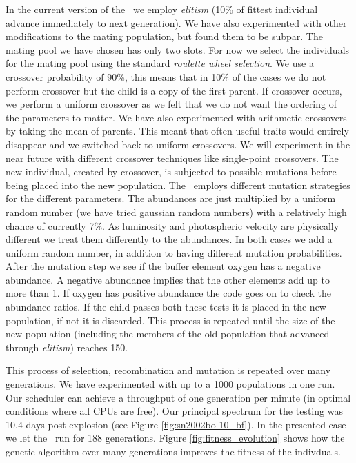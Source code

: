 In the current version of the \dalek\ we employ \textit{elitism} (10\% of fittest individual advance immediately to next generation). We have also experimented with other modifications to the mating population, but found them to be subpar. The mating pool we have chosen has only two slots. For now we select the individuals for the mating pool using the standard \textit{roulette wheel selection}. We use a crossover probability of 90\%, this means that in 10\% of the cases we do not perform crossover but the child is a copy of the first parent. If crossover occurs, we perform a uniform crossover as we felt that we do not want the ordering of the parameters to matter. We have also experimented with arithmetic crossovers by taking the mean of parents. This meant that often useful traits would entirely disappear and we switched back to uniform crossovers. We will experiment in the near future with different crossover techniques like single-point crossovers. The new individual, created by crossover, is subjected to possible mutations before being placed into the new population. The \dalek\ employs different mutation strategies for the different parameters. The abundances are just multiplied by a uniform random number (we have tried gaussian random numbers) with a relatively high chance of currently 7\%. As luminosity and photospheric velocity are physically different we treat them differently to the abundances. In both cases we add a uniform random number, in addition to having different mutation probabilities. After the mutation step we see if the buffer element oxygen has a negative abundance. A negative abundance implies that the other elements add up to more than 1. If oxygen has positive abundance the code goes on to check the abundance ratios. If the child passes both these tests it is placed in the new population, if not it is discarded. This process is repeated until the size of the new population (including the members of the old population that advanced through \textit{elitism}) reaches 150.

This process of selection, recombination and mutation is repeated over many generations. We have experimented with up to a 1000 populations in one run. Our scheduler can achieve a throughput of one generation per minute (in optimal conditions where all CPUs are free). 
Our principal spectrum for the testing was  10.4 days post explosion (see Figure \ref{fig:sn2002bo-10_bf}). 
In the presented case we let the \ga\ run for 188 generations. Figure \ref{fig:fitness_evolution} shows how the genetic algorithm over many generations improves the fitness of the indivduals. 


